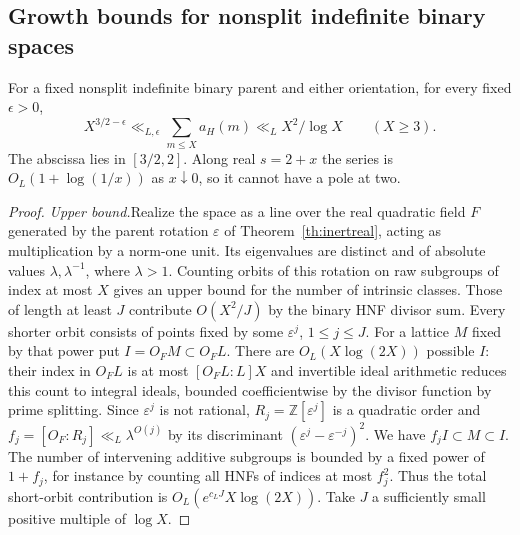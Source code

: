 \subsection{Growth bounds for nonsplit indefinite binary spaces}
\begin{theorem}\label{th:realgrowth}
For a fixed nonsplit indefinite binary parent and either orientation, for every fixed \(\epsilon>0\),
\[
 X^{3/2-\epsilon}\ll_{L,\epsilon}\sum_{m\le X}a_H(m)\ll_L X^2/\log X\qquad(X\ge3).
\]
The abscissa lies in \([3/2,2]\). Along real \(s=2+x\) the series is \(O_L(1+\log(1/x))\) as \(x\downarrow0\), so it cannot have a pole at two.
\end{theorem}
\begin{proof}
\emph{Upper bound.}\quad Realize the space as a line over the real quadratic field \(F\) generated by the parent rotation \(\varepsilon\) of Theorem~\ref{th:inertreal}, acting as multiplication by a norm-one unit. Its eigenvalues are distinct and of absolute values \(\lambda,\lambda^{-1}\), where \(\lambda>1\). Counting orbits of this rotation on raw subgroups of index at most \(X\) gives an upper bound for the number of intrinsic classes. Those of length at least \(J\) contribute \(O(X^2/J)\) by the binary HNF divisor sum. 
Every shorter orbit consists of points fixed by some \(\varepsilon^j\), \(1\le j\le J\). For a lattice \(M\) fixed by that power put \(I=O_F M\subset O_F L\). There are \(O_L(X\log(2X))\) possible \(I\): their index in \(O_F L\) is at most \([O_F L:L]X\) and invertible ideal arithmetic reduces this count to integral ideals, bounded coefficientwise by the divisor function by prime splitting. Since \(\varepsilon^j\) is not rational, \(R_j=\mathbb Z[\varepsilon^j]\) is a quadratic order and \(f_j=[O_F:R_j]\ll_L \lambda^{O(j)}\) by its discriminant \((\varepsilon^j-\varepsilon^{-j})^2\). We have \(f_jI\subset M\subset I\). The number of intervening additive subgroups is bounded by a fixed power of \(1+f_j\), for instance by counting all HNFs of indices at most \(f_j^2\). 
Thus the total short-orbit contribution is \(O_L(e^{c_LJ}X\log(2X))\). Take \(J\) a sufficiently small positive multiple of \(\log X\).


\end{proof}
